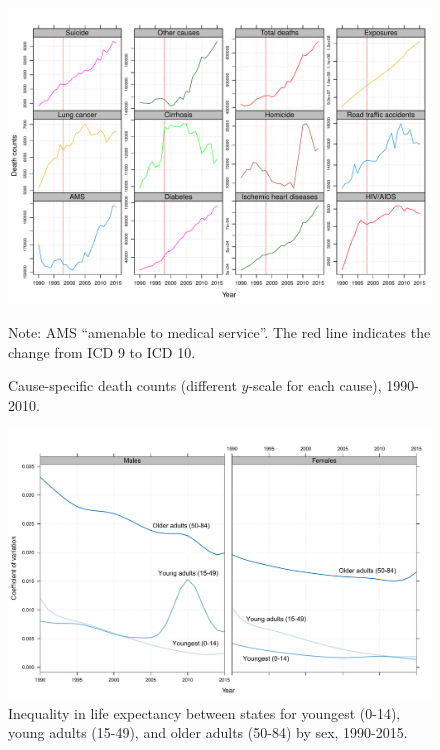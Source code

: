 \documentclass[11.5pt]{article}
\begin{document}
{\begin{figure}
\centering
\caption{Cause-specific death counts (different $y$-scale for each cause), 1990-2010.}
\label{fig:ClassSens}
\includegraphics[scale=.65]{Sensitivity_fig.pdf}

Note: AMS ``amenable to medical service''. The red line indicates the change from ICD 9 to ICD 10. 
\end{figure}

\begin{figure}[h!]
\centering
\caption{Inequality in life expectancy between states for youngest (0-14), young adults (15-49), and older adults (50-84) by sex, 1990-2015.}
\label{fig:Gini}
\includegraphics[scale=.45]{CVfig.pdf}
\end{figure}

}
\end{document}

